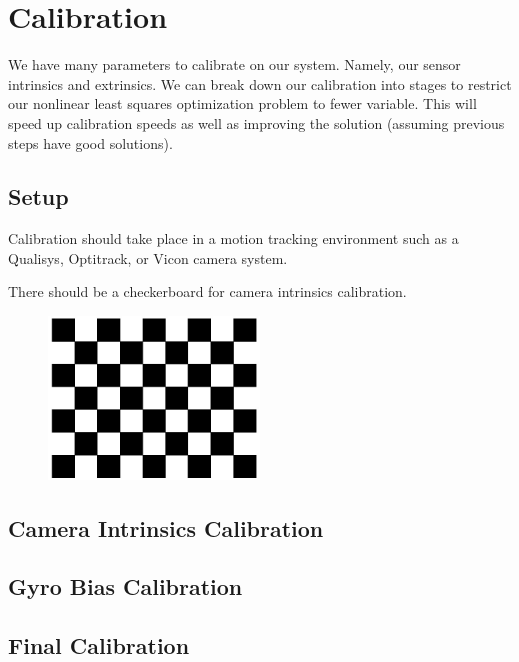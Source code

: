 \documentclass[11pt]{article}
\begin{document}
\begin{figure}
\centering
{}
\end{figure}

\section{Calibration}
We have many parameters to calibrate on our system. Namely, our sensor intrinsics and extrinsics. We can break down our calibration into stages to restrict our nonlinear least squares optimization problem to fewer variable. This will speed up calibration speeds as well as improving the solution (assuming previous steps have good solutions).

\subsection{Setup}
Calibration should take place in a motion tracking environment such as a Qualisys, Optitrack, or Vicon camera system.

There should be a checkerboard for camera intrinsics calibration.
\begin{figure}[H]
\centering
\includegraphics[width=0.5\textwidth]{checkerboard}
\end{figure}

\subsection{Camera Intrinsics Calibration}

\subsection{Gyro Bias Calibration}
\subsection{Final Calibration}
\end{document}
